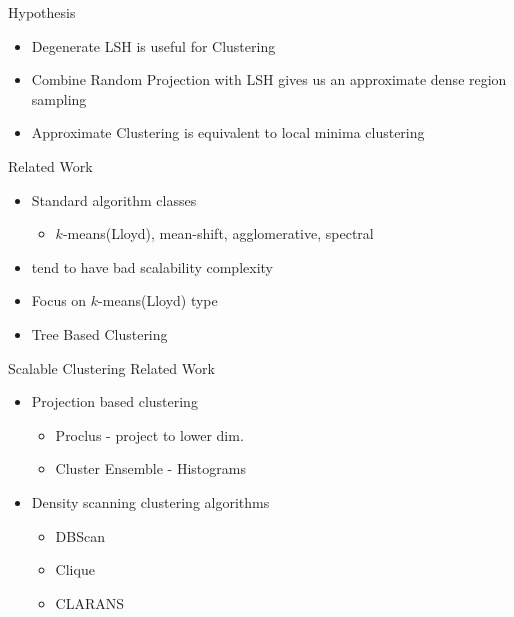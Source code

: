 \documentclass[12pt]{beamer}
\begin{document}
\begin{frame}[plain]{Hypothesis}
\begin{itemize}
  \item Degenerate LSH is useful for Clustering
  \item Combine Random Projection with LSH gives us an approximate dense region sampling
  \item Approximate Clustering is equivalent to local minima clustering
  \end{itemize}
\end{frame}

\begin{frame}[plain]{Related Work}
\begin{itemize}
 \item Standard algorithm classes
 \begin{itemize}
  \item $k$-means(Lloyd), mean-shift, agglomerative, spectral
 \end{itemize}
 \item tend to have bad scalability complexity
 \item Focus on $k$-means(Lloyd) type
 \end{itemize}
 \begin{itemize}
  \item Tree Based Clustering\cite{Liu2000}
 \end{itemize}

 \end{frame}
 
 \begin{frame}[plain]{Scalable Clustering Related Work}
  \begin{itemize}
    \item Projection based clustering
    \begin{itemize}
      \item Proclus - project to lower dim.
      \item Cluster Ensemble - Histograms
    \end{itemize}
    \item Density scanning clustering algorithms
    \begin{itemize}
    \item DBScan
    \item Clique
    \item CLARANS
    \end{itemize}
  \end{itemize}
\end{frame}
 
\end{document}
